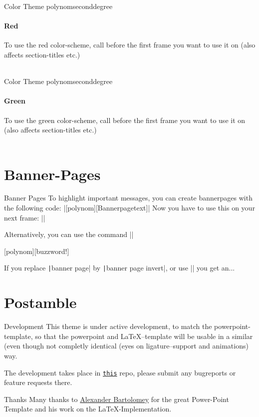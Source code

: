 \documentclass[fragile=singleslide]{beamer}
\begin{document}
\setPaletteRed
\begin{frame}{Color Theme polynomseconddegree}
  \framesubtitle{Red}

  To use the red color-scheme, call \texttt{\setPaletteRed}
  before the first frame you want to use it on (also affects
  section-titles etc.) \\
  \paletteColors\\
  
\end{frame}

\setPaletteGreen
\begin{frame}{Color Theme polynomseconddegree}
  \framesubtitle{Green}

  To use the green color-scheme, call \texttt{\setPaletteGreen}
  before the first frame you want to use it on (also affects
  section-titles etc.) \\
  \paletteColors\\
  
\end{frame}
\setPaletteBlue

\section{Banner-Pages}
\begin{frame}{Banner Pages}
  To highlight important messages, you can create bannerpages with the
  following code:
  |[polynom][Bannerpagetext]|
  Now you have to use this on your next frame:
  ||

  Alternatively, you can use the command
  ||
\end{frame}

[polynom][buzzword!]
\begin{frame}
\end{frame}

\begin{frame}
  If you replace \texttt|banner page| by
  \texttt|banner page invert|, or use ||
  you get an...
\end{frame}



\section{Postamble}
\begin{frame}{Development}
  This theme is under active development, to match the
  powerpoint-template, so that the powerpoint and LaTeX--template will
  be usable in a similar (even though not completly identical (eyes on
  ligature--support and animations) way.

  The development takes place in
  \href{https://git.rwth-aachen.de/ACHinrichs/LaTeX-templates/}{\texttt{this}}
  repo, please submit any bugreports or feature requests there.
\end{frame}

\begin{frame}{Thanks}
  Many thanks to \href{https://www.occloxium.com/}{Alexander Bartolomey} for the great Power-Point
  Template and his work on the LaTeX-Implementation. 
\end{frame}
\end{document}

